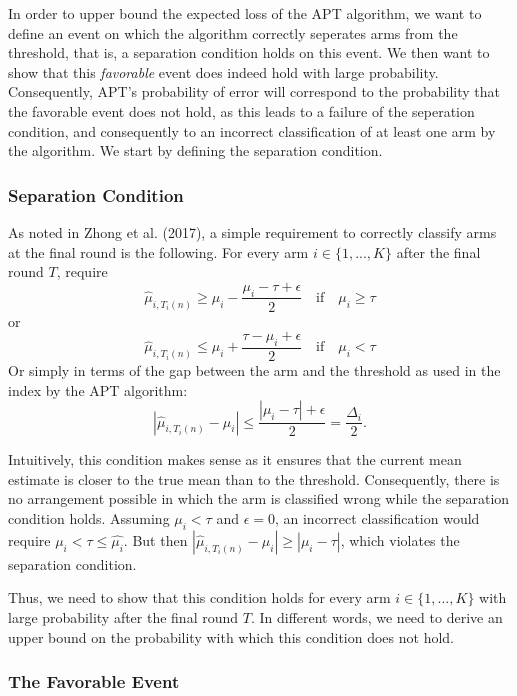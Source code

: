 \documentclass[12pt,]{article}
\begin{document}
In order to upper bound the expected loss of the APT algorithm, we want
to define an event on which the algorithm correctly seperates arms from
the threshold, that is, a separation condition holds on this event. We
then want to show that this \emph{favorable} event does indeed hold with
large probability. Consequently, APT's probability of error will
correspond to the probability that the favorable event does not hold, as
this leads to a failure of the seperation condition, and consequently to
an incorrect classification of at least one arm by the algorithm. We
start by defining the separation condition.

\subsubsection{Separation Condition}\label{separation-condition}

As noted in Zhong et al. (2017), a simple requirement to correctly
classify arms at the final round is the following. For every arm
\(i \in \{1, ..., K\}\) after the final round \(T\), require \[
\hat{\mu}_{i,T_i(n)} \geq \mu_i - \frac{\mu_i - \tau + \epsilon}{2} \quad \text{if} \quad \mu_i \geq \tau
\] or \[
\hat{\mu}_{i,T_i(n)} \leq \mu_i + \frac{\tau - \mu_i + \epsilon}{2} \quad \text{if} \quad \mu_i < \tau
\] Or simply in terms of the gap between the arm and the threshold as
used in the index by the APT algorithm: \[
| \hat{\mu}_{i, T_i(n)} - \mu_i | \leq \frac{|\mu_i - \tau| + \epsilon}{2} = \frac{\Delta_i}{2}.
\]

Intuitively, this condition makes sense as it ensures that the current
mean estimate is closer to the true mean than to the threshold.
Consequently, there is no arrangement possible in which the arm is
classified wrong while the separation condition holds. Assuming
\(\mu_i < \tau\) and \(\epsilon = 0\), an incorrect classification would
require \(\mu_i < \tau \leq \hat{\mu_i}\). But then
\(| \hat{\mu}_{i, T_i(n)} - \mu_i | \geq |\mu_i - \tau|\), which
violates the separation condition.

Thus, we need to show that this condition holds for every arm
\(i \in \{1,...,K\}\) with large probability after the final round
\(T\). In different words, we need to derive an upper bound on the
probability with which this condition does not hold.

\subsubsection{The Favorable Event}\label{the-favorable-event}
\end{document}
